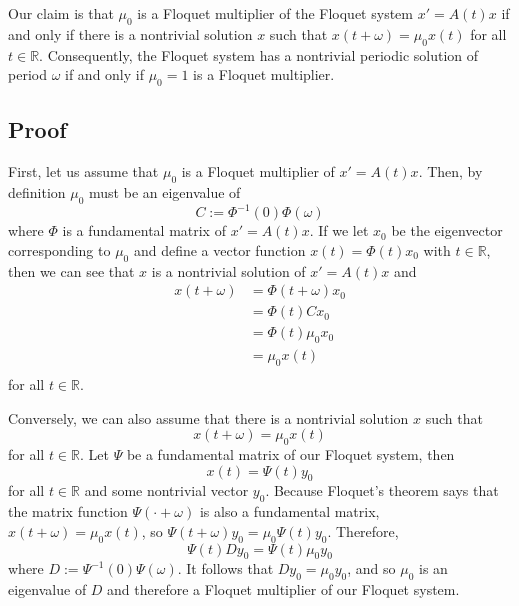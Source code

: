 \documentclass[a4paper]{article}
\begin{document}
Our claim is that $\mu_0$ is a Floquet multiplier of the Floquet system $x' = A(t)x$ if and only if there is a nontrivial solution $x$ such that $x(t + \omega) = \mu_0 x(t)$ for all $t \in \mathbb{R}$. Consequently, the Floquet system has a nontrivial periodic solution of period $\omega$ if and only if $\mu_0 = 1$ is a Floquet multiplier.

\subsection{Proof}

First, let us assume that $\mu_0$ is a Floquet multiplier of $x' = A(t)x$. Then, by definition $\mu_0$ must be an eigenvalue of 
\begin{equation*}
    C := \Phi^{-1}(0)\Phi(\omega)
\end{equation*}
where $\Phi$ is a fundamental matrix of $x' = A(t)x$. If we let $x_0$ be the eigenvector corresponding to $\mu_0$ and define a vector function $x(t) = \Phi(t)x_0$ with $t \in \mathbb{R}$, 
then we can see that $x$ is a nontrivial solution of $x' = A(t)x$ and \begin{equation*}
\begin{split}
    x(t + \omega) &= \Phi(t + \omega) x_0 \\
                  &= \Phi(t) C x_0\\
                  &= \Phi(t) \mu_0 x_0 \\
                  &= \mu_0 x(t) \\
\end{split}
\end{equation*}
for all $t \in \mathbb{R}$.

Conversely, we can also assume that there is a nontrivial solution $x$ such that \begin{equation*}
    x(t + \omega) = \mu_0 x(t)
\end{equation*}
for all $t \in \mathbb{R}$. Let $\Psi$ be a fundamental matrix of our Floquet system, then \begin{equation*}
    x(t) = \Psi(t) y_0
\end{equation*}
for all $t \in \mathbb{R}$ and some nontrivial vector $y_0$. Because Floquet's theorem says that the matrix function $\Psi(\cdot + \omega)$ is also a fundamental matrix, $x(t + \omega) = \mu_0 x(t)$, so $\Psi(t + \omega)y_0 = \mu_0 \Psi(t) y_0$. Therefore,\begin{equation*}
    \Psi(t) D y_0 = \Psi(t) \mu_0 y_0
\end{equation*}
where $D := \Psi^{-1}(0) \Psi(\omega)$. It follows that $D y_0 = \mu_0 y_0$, and so $\mu_0$ is an eigenvalue of $D$ and therefore a Floquet multiplier of our Floquet system.
\end{document}
